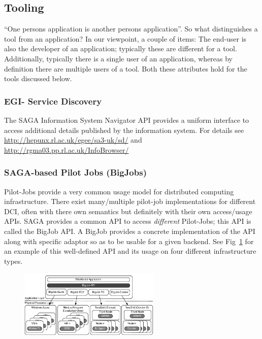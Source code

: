 \documentclass[12pt]{article}
\begin{document}
\subsection{Tooling}
``One persons application is another persons application''. So what
distinguishes a tool from an application?  In our viewpoint, a couple
of items: The end-user is also the developer of an application;
typically these are different for a tool. Additionally, typically
there is a single user of an application, whereas by definition there
are multiple users of a tool. Both these attributes hold for the tools
discussed below.


\subsubsection*{EGI- Service Discovery}

The SAGA Information System Navigator API provides a uniform interface
to access additional details published by the information system.  For
details see \url{http://hepunx.rl.ac.uk/egee/sa3-uk/sd/} and
\url{http://rgma03.pp.rl.ac.uk/InfoBrowser/}

\subsubsection*{SAGA-based Pilot Jobs (BigJobs)}

Pilot-Jobs provide a very common usage model for distributed computing
infrastructure. There exist many/multiple pilot-job implementations
for different DCI, often with there own semantics but definitely with
their own access/usage APIs. SAGA provides a common API to access {\it
  different} Pilot-Jobs; this API is called the BigJob API. A BigJob
provides a concrete implementation of the API along with specific
adaptor so as to be usable for a given backend. See
Fig~\ref{fig:sagabigjob} for an example of this well-defined API and
its usage on four different infrastructure types.
\begin{figure}[t]
      \centering
      \includegraphics[width=0.6\textwidth]{distributed_pilot_job.png}
      \caption{\footnotesize }
      \label{fig:sagabigjob}
\end{figure}
\end{document}
